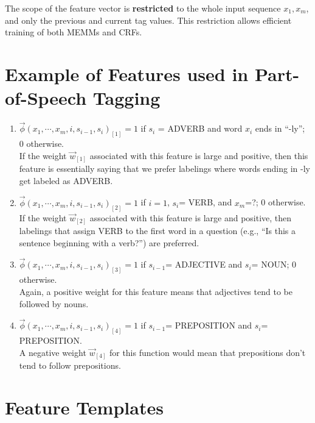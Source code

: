The scope of the feature vector is \textbf{restricted} to the whole input sequence $x_1, x_m$, and only the previous and current tag values. This restriction allows efficient training of both MEMMs and CRFs.


\section{Example of Features used in Part-of-Speech Tagging}

\begin{enumerate}
 \item $\vec{\phi}(x_1, \cdots, x_m, i, s_{i-1},s_i)_{[1]}=1$ if $s_i$ = ADVERB and word $x_i$ ends in ``-ly''; 0 otherwise. \\ 
 
 If the weight $\vec{w}_{[1]}$ associated with this feature is large and positive, then this feature is essentially saying that we prefer labelings where words ending in -ly get labeled as ADVERB.
 
 \item $\vec{\phi}(x_1, \cdots, x_m, i, s_{i-1},s_i)_{[2]}=1$ if $i=1$, $s_i$= VERB, and $x_m$=?; 0 otherwise. 
 \\ If the weight $\vec{w}_{[2]}$ associated with this feature is large and positive, then labelings that assign VERB to the first word in a question (e.g., ``Is this a sentence beginning with a verb?'') are preferred.


\item $\vec{\phi}(x_1, \cdots, x_m, i, s_{i-1},s_i)_{[3]}=1$ if $s_{i-1}$= ADJECTIVE and $s_i$= NOUN; 0 otherwise. 
\\Again, a positive weight for this feature means that adjectives tend to be followed by nouns. 

\item $\vec{\phi}(x_1, \cdots, x_m, i, s_{i-1},s_i)_{[4]}=1$ if $s_{i-1}$= PREPOSITION and $s_{i}$= PREPOSITION. 
\\ A negative weight $\vec{w}_{[4]}$ for this function would mean that prepositions don't tend to follow prepositions.

 
\end{enumerate}





\section{Feature Templates}

